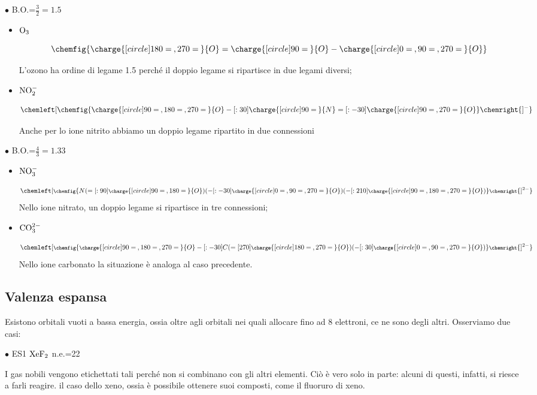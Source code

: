     $\bullet$ B.O.=$\frac{3}{2}=1.5$
    \begin{itemize}
        \item $\rm O_3$
        
        $$
        \chemfig{\charge{[circle]180=\:,270=\:}{O}=\charge{[circle]90=\:}{O}-\charge{[circle]0=\:,90=\:,270=\:}{O}}
        $$

        L'ozono ha ordine di legame 1.5 perché il doppio legame si ripartisce in due legami diversi;
        \item $\rm NO_2^-$
        
        $$
        \chemleft[ \chemfig{\charge{[circle]90=\:,180=\:,270=\:}{O}-[:30]\charge{[circle]90=\:}{N}=[:-30]\charge{[circle]90=\:,270=\:}{O}} \chemright{]^{-}}
        $$

        Anche per lo ione nitrito abbiamo un doppio legame ripartito in due connessioni
    \end{itemize}

    $\bullet$ B.O.=$\frac{4}{3}=1.33$
    \begin{itemize}
        \item $\rm NO_3^-$
        
        $$
        \chemleft[ \footnotesize\chemfig{N(=[:90]\charge{[circle]90=\:,180=\:}{O})(-[:-30]\charge{[circle]0=\:,90=\:,270=\:}{O})(-[:210]\charge{[circle]90=\:,180=\:,270=\:}{O})} \chemright{]^{2-}}
        $$
        Nello ione nitrato, un doppio legame si ripartisce in tre connessioni;
        \item $\rm CO_3^{2-}$
        
        $$
        \chemleft[ \footnotesize\chemfig{\charge{[circle]90=\:,180=\:,270=\:}{O}-[:-30]C(=[270]\charge{[circle]180=\:,270=\:}{O})(-[:30]\charge{[circle]0=\:,90=\:,270=\:}{O})} \chemright{]^{2-}}
        $$
        Nello ione carbonato la situazione è analoga al caso precedente.
    \end{itemize}
\normalsize
\subsection{Valenza espansa}
Esistono orbitali vuoti a bassa energia, ossia oltre agli orbitali nei quali allocare fino ad 8 elettroni, ce ne sono degli altri. Osserviamo due casi:

\vspace{0.2cm}$\bullet$ ES1 $\rm XeF_2$ n.e.=22

I gas nobili vengono etichettati tali perché non si combinano con gli altri elementi. Ciò è vero solo in parte: alcuni di questi, infatti, si riesce a farli reagire. \E il caso dello xeno, ossia è possibile ottenere suoi composti, come il fluoruro di xeno.

